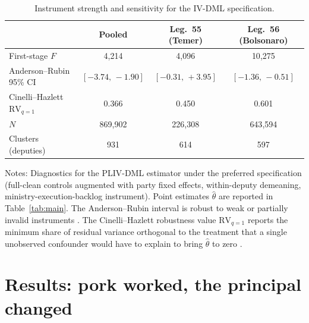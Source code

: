 \documentclass[preprint,12pt,authoryear]{elsarticle}
\begin{document}
\begin{table}[htbp]
\centering
\caption{Instrument strength and sensitivity for the IV-DML specification.}
\label{tab:iv_validation}
\begin{threeparttable}
\small
\setlength{\tabcolsep}{6pt}
\begin{tabular}{@{}lccc@{}}
\toprule
& Pooled & Leg.~55 (Temer) & Leg.~56 (Bolsonaro) \\
\midrule
First-stage $F$                      & 4{,}214           & 4{,}096           & 10{,}275          \\
Anderson--Rubin 95\% CI              & $[-3.74,\,-1.90]$ & $[-0.31,\,+3.95]$ & $[-1.36,\,-0.51]$ \\
Cinelli--Hazlett $\mathrm{RV}_{q=1}$  & 0.366             & 0.450             & 0.601             \\
$N$                                  & 869{,}902          & 226{,}308          & 643{,}594          \\
Clusters (deputies)                  & 931               & 614               & 597               \\
\bottomrule
\end{tabular}
\begin{tablenotes}
\small
\item Notes: Diagnostics for the PLIV-DML estimator under the preferred specification (full-clean controls augmented with party fixed effects, within-deputy demeaning, ministry-execution-backlog instrument). Point estimates $\hat\theta$ are reported in Table~\ref{tab:main}. The Anderson--Rubin interval is robust to weak or partially invalid instruments \citep{AndersonRubin1949}. The Cinelli--Hazlett robustness value $\mathrm{RV}_{q=1}$ reports the minimum share of residual variance orthogonal to the treatment that a single unobserved confounder would have to explain to bring $\hat\theta$ to zero \citep{CinelliHazlett2020}.
\end{tablenotes}
\end{threeparttable}
\end{table}

\section{Results: pork worked, the principal changed}
\label{sec:results}
\end{document}
